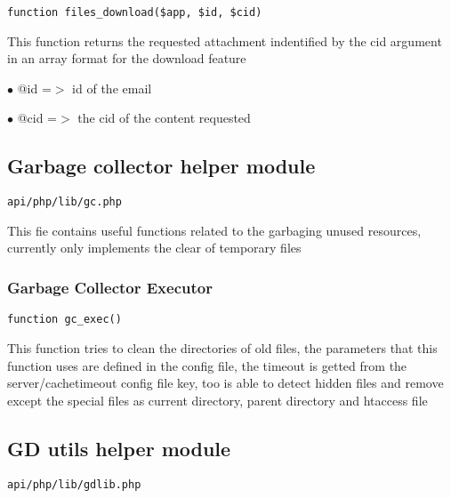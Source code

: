 \documentclass[a4paper]{article}
\begin{document}
\begin{lstlisting}
function files_download($app, $id, $cid)
\end{lstlisting}

This function returns the requested attachment indentified by the cid argument
in an array format for the download feature

\begin{compactitem}
\item[\color{myblue}$\bullet$] @id  =$>$ id of the email
\item[\color{myblue}$\bullet$] @cid =$>$ the cid of the content requested
\end{compactitem}

\hypertarget{toc452}{}
\subsection{Garbage collector helper module}

\begin{lstlisting}
api/php/lib/gc.php
\end{lstlisting}

This fie contains useful functions related to the garbaging unused resources, currently only
implements the clear of temporary files

\hypertarget{toc453}{}
\subsubsection{Garbage Collector Executor}

\begin{lstlisting}
function gc_exec()
\end{lstlisting}

This function tries to clean the directories of old files, the parameters
that this function uses are defined in the config file, the timeout is
getted from the server/cachetimeout config file key, too is able to detect
hidden files and remove except the special files as current directory,
parent directory and htaccess file

\hypertarget{toc454}{}
\subsection{GD utils helper module}

\begin{lstlisting}
api/php/lib/gdlib.php
\end{lstlisting}
\end{document}
